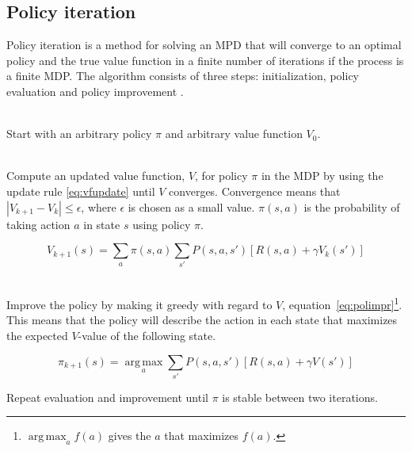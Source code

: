 \subsection{Policy iteration}
\label{sec:pol_itr}

Policy iteration is a method for solving an MPD that will converge to an
optimal policy and the true value function in a finite number of iterations if
the process is a finite MDP. The algorithm consists of three steps:
initialization, policy evaluation and policy improvement
\parencite{barto1998reinforcement}.

\begin{description}
\item[Initialization] \hfill \\
    Start with an arbitrary policy $\pi$ and arbitrary value function $V_0$.

\item[Policy evaluation] \hfill \\
  Compute an updated value function, $V$, for policy $\pi$ in the MDP by using
  the update rule \eqref{eq:vfupdate} until $V$ converges. Convergence means that $|V_{k+1} - V_{k}| \leq \epsilon$, where $\epsilon$ is chosen as a small value.   $\pi(s, a)$ is the
  probability of taking action $a$ in state $s$ using policy $\pi$.

\begin{equation} \label{eq:vfupdate}
  V_{k+1} (s) = \sum_a \pi(s, a) \sum_{s'} P(s, a, s') \left[ R(s, a) + \gamma V_k(s')  \right]
\end{equation}

\item[Policy improvement] \hfill \\
  Improve the policy by making it greedy with regard to $V$,
  equation~\eqref{eq:polimpr}\footnote{$\operatorname*{arg\,max} _a f(a)$ gives
  the $a$ that maximizes $f(a)$.}. This means that the policy will describe the
  action in each state that maximizes the expected $V$-value of the following
  state. 

\begin{equation} \label{eq:polimpr}
  \pi_{k+1} (s) = \operatorname*{arg\,max}_a \sum_{s'}P(s, a, s') \left[ R(s, a) + \gamma V(s') \right]
\end{equation}

\item Repeat evaluation and improvement until $\pi$ is stable between two iterations.
\end{description}


